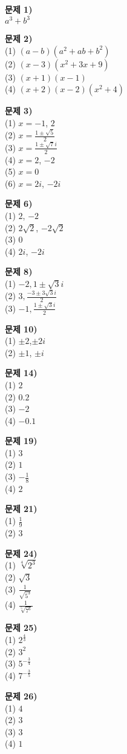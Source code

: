 \documentclass{oblivoir}
\newcommand\an[1]{\par\bigskip\noindent\textbf{문제 #1)}\\}
\begin{document}
\begin{minipage}{0.33\textwidth}
%
\an{1}
\(a^3+b^3\)

%
\an{2}
(1) \((a-b)(a^2+ab+b^2)\)\\
(2) \((x-3)(x^2+3x+9)\)\\
(3) \((x+1)(x-1)\)\\
(4) \((x+2)(x-2)(x^2+4)\)

%
\an{3}
(1) \(x=-1\), \(2\)\\
(2) \(x=\frac{1\pm\sqrt5}2\)\\
(3) \(x=\frac{1\pm\sqrt7i}2\)\\
(4) \(x=2\), \(-2\)\\
(5) \(x=0\)\\
(6) \(x=2i\), \(-2i\)

%
\an{6}
(1) \(2\), \(-2\)\\
(2) \(2\sqrt2\), \(-2\sqrt2\)\\
(3) \(0\)\\
(4) \(2i\), \(-2i\)\\

%
\an{8}
(1) \(-2,1\pm\sqrt3i\)\\
(2) \(3,\frac{-3\pm3\sqrt3i}2\)\\
(3) \(-1,\frac{1\pm\sqrt3i}2\)

%
\an{10}
(1) \(\pm2\),\(\pm2i\)\\
(2) \(\pm1\), \(\pm i\)
\end{minipage}
\begin{minipage}{0.33\textwidth}

%
\an{14}
(1) \(2\)\\
(2) \(0.2\)\\
(3) \(-2\)\\
(4) \(-0.1\)

%
\an{19}
(1) \(3\)\\
(2) \(1\)\\
(3) \(-\frac18\)\\
(4) \(2\)

%
\an{21}
(1) \(\frac19\)\\
(2) \(3\)

%
\an{24}
(1) \(\sqrt[4]{2^3}\)\\
(2) \(\sqrt{3}\)\\
(3) \(\frac1{\sqrt{5^3}}\)\\
(4) \(\frac1{\sqrt[5]{7^6}}\)

%
\an{25}
(1) \(2^{\frac43}\)\\
(2) \(3^2\)\\
(3) \(5^{-\frac34}\)\\
(4) \(7^{-\frac35}\)

%
\an{26}
(1) \(4\)\\
(2) \(3\)\\
(3) \(3\)\\
(4) \(1\)
\end{minipage}
\end{document}
